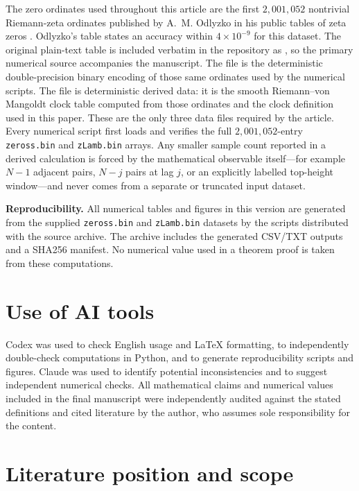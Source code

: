 \documentclass[pdflatex,sn-mathphys-num]{sn-jnl}
\numberwithin{equation}{section}
\theoremstyle{thmstyleone}
\theoremstyle{thmstylethree}
\theoremstyle{thmstyletwo}
\newcommand{\1}{\mathbf 1}
\begin{document}
The zero ordinates used throughout this article are the first
\(2{,}001{,}052\) nontrivial Riemann-zeta ordinates published by
A.~M. Odlyzko in his public tables of zeta zeros \cite{OdlyzkoZeros}.
Odlyzko's table states an accuracy within \(4\times10^{-9}\) for this dataset.
The original plain-text table is included verbatim in the repository as
, so the primary numerical source accompanies the
manuscript.  The file  is the deterministic
double-precision binary encoding of those same ordinates used by the numerical
scripts.  The file  is deterministic derived data: it is
the smooth Riemann--von Mangoldt clock table computed from those ordinates and
the clock definition used in this paper.  These are the only three data files
required by the article.  Every numerical script first loads and verifies the full
$2{,}001{,}052$-entry \texttt{zeross.bin} and \texttt{zLamb.bin} arrays.
Any smaller sample count reported in a derived calculation is forced by the
mathematical observable itself---for example $N-1$ adjacent pairs, $N-j$
pairs at lag $j$, or an explicitly labelled top-height window---and never
comes from a separate or truncated input dataset.

\medskip\noindent\textbf{Reproducibility.}
All numerical tables and figures in this version are generated from the supplied
\texttt{zeross.bin} and \texttt{zLamb.bin} datasets by the scripts distributed with
the source archive.  The archive includes the generated CSV/TXT outputs and a SHA256
manifest.  No numerical value used in a theorem proof is taken from these computations.



\section{Use of AI tools}
\label{sec:ai}

Codex was used to check English usage and LaTeX formatting, to independently double-check
computations in Python, and to generate reproducibility scripts and figures. Claude was used
to identify potential inconsistencies and to suggest independent numerical checks. All
mathematical claims and numerical values included in the final manuscript were independently
audited against the stated definitions and cited literature by the author, who assumes sole
responsibility for the content.

\section{Literature position and scope}
\end{document}

